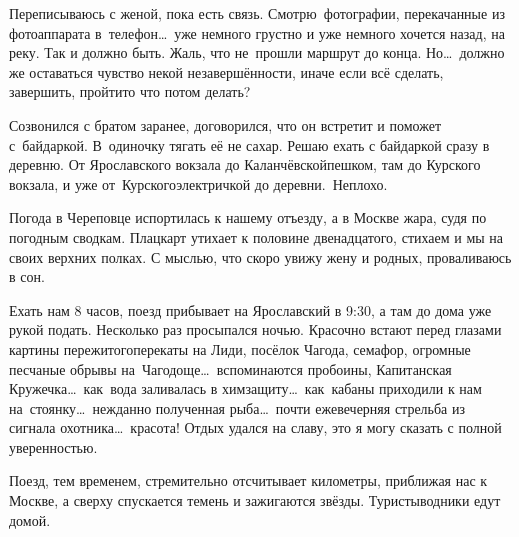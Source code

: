 Переписываюсь с женой, пока есть связь. Смотрю~фотографии, перекачанные из фотоаппарата в~телефон\ldots~уже немного грустно и уже немного хочется назад, на реку. Так и должно быть. Жаль, что не~прошли маршрут до конца. Но\ldots~должно же оставаться чувство некой незавершённости, иначе если всё сделать, завершить, пройти\mdash то что потом делать? 

Созвонился с братом заранее, договорился, что он встретит и поможет с~байдаркой. В~одиночку тягать её не сахар. Решаю ехать с байдаркой сразу в деревню. От Ярославского вокзала до Каланчёвской\mdash пешком, там до Курского вокзала, и уже от~Курского\mdash электричкой до деревни.~Неплохо. 

Погода в Череповце испортилась к нашему отъезду, а в Москве жара, судя по погодным сводкам. Плацкарт утихает к половине двенадцатого, стихаем и мы на своих верхних полках. С мыслью, что скоро увижу жену и родных, проваливаюсь в сон. 

Ехать нам 8 часов, поезд прибывает на Ярославский в 9:30, а там до дома уже рукой подать. Несколько раз просыпался ночью. Красочно встают перед глазами картины пережитого\mdash перекаты на Лиди, посёлок Чагода, семафор, огромные песчаные обрывы на~Чагодоще\ldots~вспоминаются пробоины, Капитанская Кружечка\ldots~как~вода заливалась в химзащиту\ldots~как~кабаны приходили к нам на~стоянку\ldots~нежданно полученная рыба\ldots~почти ежевечерняя стрельба из сигнала охотника\ldots~красота! Отдых удался на славу, это я могу сказать с полной уверенностью. 

Поезд, тем временем, стремительно отсчитывает километры, приближая нас к Москве, а сверху спускается темень и зажигаются звёзды. Туристы\sdash водники едут домой.     

\begin{center}
\end{center}